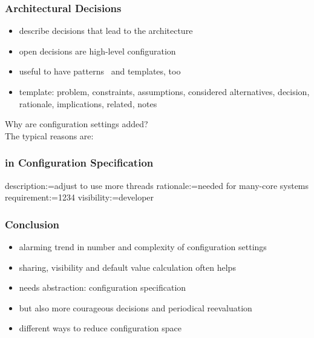 \begin{frame}
	\frametitle{Architectural Decisions}
	\begin{itemize}
	\item describe decisions that lead to the architecture
	\item open decisions are high-level configuration
	\item useful to have patterns~\cite{zdun2007patterns} and templates, too
	\item template: problem, constraints, assumptions, considered alternatives, decision, rationale, implications, related, notes
	\end{itemize}
\end{frame}

\begin{frame}
	Why are configuration settings added? \\[1cm]
	\pause
	The typical reasons are:
\end{frame}

\begin{frame}[fragile]
	\frametitle{in Configuration Specification}
	\begin{code}
	description:=adjust to use more threads
	rationale:=needed for many-core systems
	requirement:=1234
	visibility:=developer
	\end{code}
\end{frame}

\begin{frame}
	\frametitle{Conclusion}
	\begin{itemize}
	\item alarming trend in number and complexity of configuration settings
	\item sharing, visibility and default value calculation often helps
	\item needs abstraction: configuration specification
	\item but also more courageous decisions and periodical reevaluation
	\item different ways to reduce configuration space
	\end{itemize}
\end{frame}


\nocite{raab2017introducing}

\appendix

\begin{frame}[allowframebreaks]
	
	
\end{frame}




